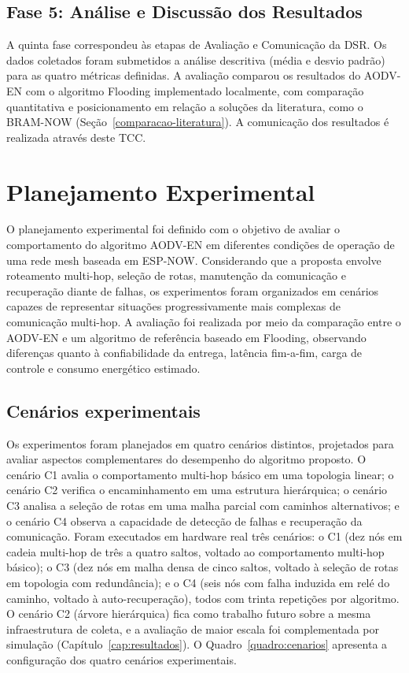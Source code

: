 \subsection{Fase 5: Análise e Discussão dos
Resultados}\label{fase-5-anuxe1lise-e-discussuxe3o-dos-resultados}

A quinta fase correspondeu às etapas de Avaliação e Comunicação da DSR.
Os dados coletados foram submetidos a análise descritiva (média e desvio
padrão) para as quatro métricas definidas. A avaliação comparou os
resultados do AODV-EN com o algoritmo Flooding implementado localmente,
com comparação quantitativa e posicionamento em relação a soluções da literatura, como o BRAM-NOW \cite{cujilema2023} (Seção~\ref{comparacao-literatura}). A comunicação dos resultados é realizada
através deste TCC.

\section{Planejamento Experimental}\label{planejamento-experimental}

O planejamento experimental foi definido com o objetivo de avaliar o
comportamento do algoritmo AODV-EN em diferentes condições de operação
de uma rede mesh baseada em ESP-NOW. Considerando que a proposta envolve
roteamento multi-hop, seleção de rotas, manutenção da comunicação e
recuperação diante de falhas, os experimentos foram organizados em
cenários capazes de representar situações progressivamente mais
complexas de comunicação multi-hop. A avaliação foi realizada por meio
da comparação entre o AODV-EN e um algoritmo de referência baseado em
Flooding, observando diferenças quanto à confiabilidade da entrega,
latência fim-a-fim, carga de controle e consumo energético estimado.

\subsection{Cenários experimentais}\label{cenuxe1rios-experimentais}

Os experimentos foram planejados em quatro cenários distintos,
projetados para avaliar aspectos complementares do desempenho do
algoritmo proposto. O cenário C1 avalia o comportamento multi-hop básico
em uma topologia linear; o cenário C2 verifica o encaminhamento em uma
estrutura hierárquica; o cenário C3 analisa a seleção de rotas em uma
malha parcial com caminhos alternativos; e o cenário C4 observa a
capacidade de detecção de falhas e recuperação da comunicação.
Foram executados em hardware real três cenários: o C1 (dez nós em cadeia
multi-hop de três a quatro saltos, voltado ao comportamento multi-hop básico);
o C3 (dez nós em malha densa de cinco saltos, voltado à seleção de rotas em
topologia com redundância); e o C4 (seis nós com falha induzida em relé do
caminho, voltado à auto-recuperação), todos com trinta repetições por
algoritmo. O cenário C2 (árvore hierárquica) fica como trabalho futuro sobre a
mesma infraestrutura de coleta, e a avaliação de maior escala foi complementada
por simulação (Capítulo~\ref{cap:resultados}). O Quadro~\ref{quadro:cenarios} apresenta a
configuração dos quatro cenários experimentais.

